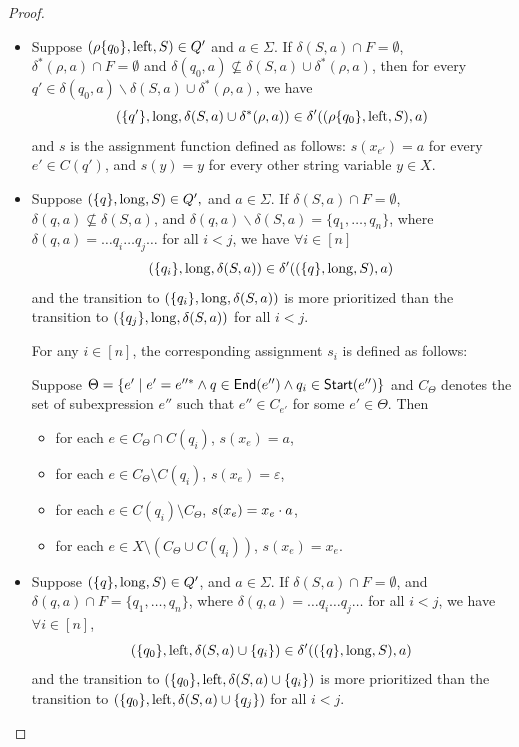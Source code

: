 \begin{proof}
\begin{itemize}
  \item Suppose $(\rho \{ q_0 \}, \operatorname{left}, S) \in Q'$ and $a \in \Sigma$.
  If $\delta (S, a) \cap F = \emptyset$, $\delta^{\ast} (\rho, a) \cap F = \emptyset$
  and $\delta (q_0, a) \nsubseteq \delta (S, a) \cup \delta^{\ast} (\rho, a)$, then
  for every $q' \in \delta (q_0, a) \backslash \delta (S, a) \cup \delta^{\ast}
  (\rho, a)$, we have
  \[ (\{ q' \}, \operatorname{long}, \delta (S, a) \cup \delta^{\ast} (\rho, a)) \in \delta'
     ((\rho \{ q_0 \}, \operatorname{left}, S), a) \]
  and $s$ is the assignment function defined as follows: $s(x_{e'}) = a$ for every $e'  \in C(q')$, and $s(y)=y$ for every other string variable $y \in X$.
  
  \item Suppose $(\{ q \}, \operatorname{long}, S) \in Q',$ and $a \in \Sigma$. If
  $\delta (S, a) \cap F = \emptyset$, $\delta (q, a) \nsubseteq \delta (S,
  a)$, and $\delta (q, a) \backslash \delta (S, a) = \{ q_1, \ldots,
  q_n \}$, where $\delta (q, a) = \ldots q_i \ldots q_j \ldots$ for all $i < j$,
  we have $\forall i \in [n]$
  \[ (\{ q_i \}, \operatorname{long}, \delta (S, a)) \in \delta' ((\{ q \},
     \operatorname{long}, S), a) \]
  and the transition to $(\{ q_i \}, \operatorname{long}, \delta (S, a))$ is more prioritized than the transition to
  $(\{ q_j \}, \operatorname{long}, \delta (S, a))$ for all $i < j$. 
  
  For any $i \in [n]$, the corresponding assignment $s_i$ is defined as follows:
  
  Suppose $\Theta = \{e' \mid e' = e''^*  \wedge
  q \in {\sf End}(e'') \wedge q_i \in {\sf Start}(e'') \}$ and $C_{\Theta}$ denotes the set of subexpression $e''$ such that $e'' \in C_{e'}$ for some $e' \in \Theta$.
Then 
\begin{itemize}
\item for each $e \in C_{\Theta} \cap C(q_i)$, $s(x_e) = a$,
%
\item for each $e \in C_{\Theta} \setminus C(q_i)$, $s(x_e) = \varepsilon$, 
%
\item for each $e \in C(q_i) \setminus C_\Theta$, $s(x_e) = x_e \cdot a$,
%
\item for each $e \in X \setminus (C_\Theta \cup C(q_i))$, $s(x_e)= x_e$.
\end{itemize}

    \item Suppose $(\{ q \}, \operatorname{long}, S) \in Q'$, and $a \in \Sigma$. If
  $\delta (S, a) \cap F = \emptyset$, and $\delta (q, a) \cap F = \{ q_1,
  \ldots, q_n \}$, where $\delta (q, a) = \ldots q_i \ldots q_j \ldots$ for all
  $i < j$, we have $\forall i \in [n]$,
  \[ (\{ q_0 \}, \operatorname{left}, \delta (S, a) \cup \{ q_i \}) \in \delta' ((\{ q
     \}, \operatorname{long}, S), a) \]
  and the transition to $(\{ q_0 \}, \operatorname{left}, \delta (S, a) \cup \{ q_i \})$ is more
  prioritized than the transition to $(\{ q_0 \}, \operatorname{left}, \delta (S, a) \cup \{ q_j \})$
  for all $i < j$.
  

\end{itemize}
\end{proof}
